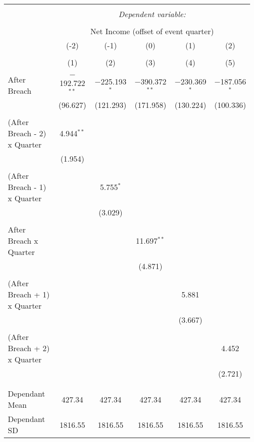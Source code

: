 
\begin{table}[!htbp] \centering 
  \caption{} 
  \label{} 
\begin{tabular}{@{\extracolsep{5pt}}lccccc} 
\\[-1.8ex]\hline 
\hline \\[-1.8ex] 
 & \multicolumn{5}{c}{\textit{Dependent variable:}} \\ 
\cline{2-6} 
\\[-1.8ex] & \multicolumn{5}{c}{Net Income (offset of event quarter)} \\ 
 & (-2) & (-1) & (0) & (1) & (2) \\ 
\\[-1.8ex] & (1) & (2) & (3) & (4) & (5)\\ 
\hline \\[-1.8ex] 
 After Breach & $-$192.722$^{**}$ & $-$225.193$^{*}$ & $-$390.372$^{**}$ & $-$230.369$^{*}$ & $-$187.056$^{*}$ \\ 
  & (96.627) & (121.293) & (171.958) & (130.224) & (100.336) \\ 
  & & & & & \\ 
 (After Breach - 2) x Quarter & 4.944$^{**}$ &  &  &  &  \\ 
  & (1.954) &  &  &  &  \\ 
  & & & & & \\ 
 (After Breach - 1) x Quarter &  & 5.755$^{*}$ &  &  &  \\ 
  &  & (3.029) &  &  &  \\ 
  & & & & & \\ 
 After Breach x Quarter &  &  & 11.697$^{**}$ &  &  \\ 
  &  &  & (4.871) &  &  \\ 
  & & & & & \\ 
 (After Breach + 1) x Quarter &  &  &  & 5.881 &  \\ 
  &  &  &  & (3.667) &  \\ 
  & & & & & \\ 
 (After Breach + 2) x Quarter &  &  &  &  & 4.452 \\ 
  &  &  &  &  & (2.721) \\ 
  & & & & & \\ 
\hline \\[-1.8ex] 
Dependant Mean & 427.34 & 427.34 & 427.34 & 427.34 & 427.34 \\ 
Dependant SD & 1816.55 & 1816.55 & 1816.55 & 1816.55 & 1816.55 \\ 

\end{tabular}
\end{table}
